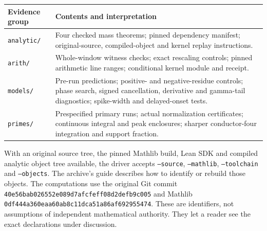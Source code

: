 \documentclass[12pt,letterpaper]{article}
\begin{document}
\begin{center}\small\begin{tabularx}{\linewidth}{@{}p{.20\linewidth}Y@{}}
\toprule
Evidence group & Contents and interpretation\\\midrule
\texttt{analytic/}& Four checked mass theorems; pinned dependency manifest; original-source, compiled-object and kernel replay instructions.\\
\texttt{arith/}& Whole-window witness checks; exact rescaling controls; pinned arithmetic line ranges; conditional kernel module and receipt.\\
\texttt{models/}& Pre-run predictions; positive- and negative-residue controls; phase search, signed cancellation, derivative and gamma-tail diagnostics; spike-width and delayed-onset tests.\\
\texttt{primes/}& Prespecified primary runs; actual normalization certificates; continuous integral and peak enclosures; sharper conductor-four integration and support fraction.\\
\bottomrule\end{tabularx}\end{center}
With an original source tree, the pinned Mathlib build, Lean SDK and compiled analytic object tree available, the driver accepts \texttt{--source}, \texttt{--mathlib}, \texttt{--toolchain} and \texttt{--objects}. The archive's guide describes how to identify or rebuild those objects. The computations use the original Git commit \texttt{40e56bab026552e089d7afcfeff08d2defb9c005} and Mathlib \texttt{0df444a360eaa60ab8c11dca51a86af692955474}. These are identifiers, not assumptions of independent mathematical authority. They let a reader see the exact declarations under discussion.
\end{document}
